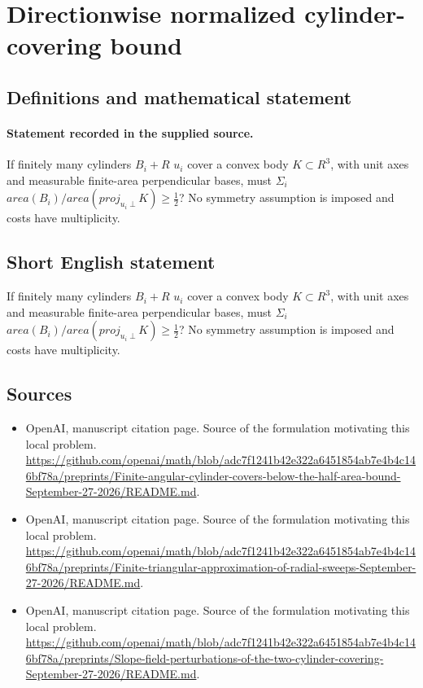 \documentclass[11pt]{article}
\begin{document}
\section*{Directionwise normalized cylinder-covering bound}\label{30007115}
\subsection{Definitions and mathematical statement}
\paragraph{Statement recorded in the supplied source.}
If finitely many cylinders $B_i+R$ $u_i$ cover a convex body $K\subset R^{3}$, with unit axes and measurable finite-area perpendicular bases, must $\Sigma _i$ $area(B_i)/area(proj_{u_i\perp }K)\geq \tfrac12 $? No symmetry assumption is imposed and costs have multiplicity.
\subsection{Short English statement}
If finitely many cylinders $B_i+R$ $u_i$ cover a convex body $K\subset R^{3}$, with unit axes and measurable finite-area perpendicular bases, must $\Sigma _i$ $area(B_i)/area(proj_{u_i\perp }K)\geq \tfrac12 $? No symmetry assumption is imposed and costs have multiplicity.
\subsection{Sources}
\begin{itemize}
\item[S1] OpenAI, manuscript citation page. Source of the formulation motivating this local problem.
\url{https://github.com/openai/math/blob/adc7f1241b42e322a6451854ab7e4b4c146bf78a/preprints/Finite-angular-cylinder-covers-below-the-half-area-bound-September-27-2026/README.md}.
\item[S2] OpenAI, manuscript citation page. Source of the formulation motivating this local problem.
\url{https://github.com/openai/math/blob/adc7f1241b42e322a6451854ab7e4b4c146bf78a/preprints/Finite-triangular-approximation-of-radial-sweeps-September-27-2026/README.md}.
\item[S3] OpenAI, manuscript citation page. Source of the formulation motivating this local problem.
\url{https://github.com/openai/math/blob/adc7f1241b42e322a6451854ab7e4b4c146bf78a/preprints/Slope-field-perturbations-of-the-two-cylinder-covering-September-27-2026/README.md}.
\end{itemize}
\end{document}
